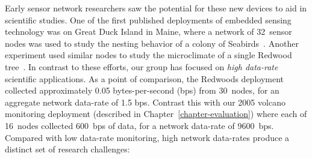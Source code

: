 Early sensor network researchers saw the potential for these new devices to
aid in scientific studies. One of the first published deployments of embedded
sensing technology was on Great Duck Island in Maine, where a network of
32~sensor nodes was used to study the nesting behavior of a colony of
Seabirds~\cite{gdi-sensys04}. Another experiment used similar nodes to study
the microclimate of a single Redwood tree~\cite{berkeley-redwoods}. In
contrast to these efforts, our group has focused on \textit{high data-rate}
scientific applications. As a point of comparison, the Redwoods deployment
collected approximately 0.05 bytes-per-second (bps) from 30~nodes, for an
aggregate network data-rate of 1.5 bps. Contrast this with our 2005 volcano
monitoring deployment (described in Chapter~\ref{chapter-evaluation}) where
each of 16~nodes collected 600~bps of data, for a network data-rate of
9600~bps. Compared with low data-rate monitoring, high network data-rates
produce a distinct set of research challenges:

